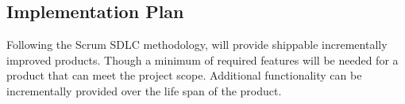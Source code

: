 \documentclass[10pt,twocolumn]{witseiepaper}
\begin{document}
\subsection{Implementation Plan}

Following the Scrum SDLC methodology, will provide shippable incrementally improved products. Though a minimum of required features will be needed for a product that can meet the project scope. Additional functionality can be incrementally provided over the life span of the product.




%



\end{document}
